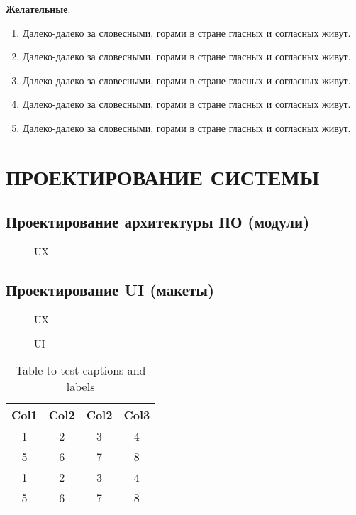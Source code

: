 \documentclass[
    12pt, %
    a4paper, %
    simple, %
    floatsection %
]{eskdtext}
\begin{document}
\textbf{Желательные}:
\begin{enumerate}
    \item Далеко-далеко за словесными, горами в стране гласных и согласных живут.
    \item Далеко-далеко за словесными, горами в стране гласных и согласных живут.
    \item Далеко-далеко за словесными, горами в стране гласных и согласных живут.
    \item Далеко-далеко за словесными, горами в стране гласных и согласных живут.
    \item Далеко-далеко за словесными, горами в стране гласных и согласных живут.
\end{enumerate}


\newpage
\section{ПРОЕКТИРОВАНИЕ СИСТЕМЫ}

\subsection{Проектирование архитектуры ПО (модули)}

\begin{figure}[!h]
    \centering
    \caption{UX}
\end{figure}

\subsection{Проектирование UI (макеты)}

\begin{figure}[!h]
    \centering
    \caption{UX}
\end{figure}

\begin{figure}[!h]
    \centering
    \caption{UI}
\end{figure}

\begin{table}[h!]
    \centering
    \begin{tabular}{|c|c|c|c|} 
        \hline
        Col1 & Col2 & Col2 & Col3 \\
        \hline
        1 & 2 & 3 & 4 \\ \hline
        5 & 6 & 7 & 8 \\ \hline
        1 & 2 & 3 & 4 \\ \hline
        5 & 6 & 7 & 8 \\ \hline
    \end{tabular}
    \caption{Table to test captions and labels}
    \label{table:1}
\end{table}
\end{document}
